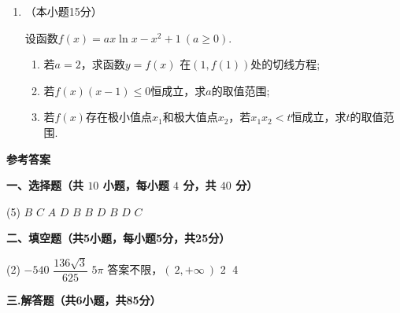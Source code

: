 \documentclass[11pt,a4paper]{ctexart}
\newcommand{\sectiontitle}[1]{
  \par\noindent\textbf{#1}\par%
  }
\newcounter{chapPage}
\begin{document}
\begin{enumerate}[start=16]
    \vspace*{\fill}
    \item （本小题15分）
    
    设函数$f(x)=ax\ln x-x^2+1\ (a \ge 0)$.
    \begin{enumerate}[label=(\Roman*)]
        \item 若$a=2$，求函数$y=f(x)$ 在$(1,f(1))$处的切线方程;
        \item 若$f(x)(x-1) \le 0$恒成立，求$a$的取值范围;
        \item 若$f(x)$存在极小值点$x_1$和极大值点$x_2$，若$x_1 x_2<t$恒成立，求$t$的取值范围.
    \end{enumerate}
    \vspace*{\fill}
    
\end{enumerate}

\clearpage %
\setcounter{enumi}{0}   %
{} %
\setcounter{chapPage}{1} %

\begin{center} 
    {\LARGE \textbf{参考答案}}\\[1em]
\end{center}

\sectiontitle{一、选择题（共 $10$ 小题，每小题 $4$ 分，共 $40$ 分）}

    \begin{tasks}[label=(\arabic*), after-item-skip=0.6em,start=1] (5)
        \task $B$ 
        \task $C$
        \task $A$
        \task $D$        
        \task $B$
        \task $B$        
        \task $D$
        \task $B$        
        \task $D$
        \task $C$
    \end{tasks}

\sectiontitle{二、填空题（共5小题，每小题5分，共25分）}

    \begin{tasks}[label=(\arabic*), after-item-skip=0.6em,start=11] (2)
        \task $-540$ 
        \task $\dfrac{136 \sqrt{3} }{625}$
        \task $5 \pi$
        \task 答案不限，$(\ 2,+\infty\ )$        
        \task \textcircled{2} \textcircled{4}
    \end{tasks}

\sectiontitle{三.解答题（共6小题，共85分）}
\end{document}
